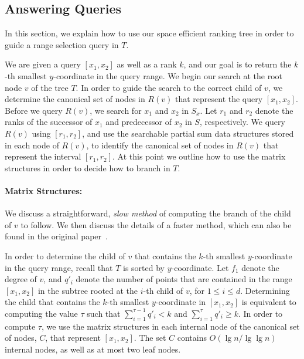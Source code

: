 \documentclass{llncs}
\begin{document}
\subsection{Answering Queries\label{sec:answering}}

In this section, we explain how to use our space efficient ranking
tree in order to guide a range selection query in $T$.

We are given a query $[x_1,x_2]$ as well as a rank $k$, and our goal
is to return the $k$-th smallest $y$-coordinate in the query range.
We begin our search at the root node $v$ of the tree $T$.  In order to
guide the search to the correct child of $v$, we determine the
canonical set of nodes in $R(v)$ that represent the query $[x_1,x_2]$.
Before we query $R(v)$, we search for $x_1$ and $x_2$ in $S_x$.  Let
$r_1$ and $r_2$ denote the ranks of the successor of $x_1$ and
predecessor of $x_2$ in $S$, respectively. We query $R(v)$ using
$[r_1, r_2]$, and use the searchable partial sum data structures
stored in each node of $R(v)$, to identify the canonical set of nodes
in $R(v)$ that represent the interval $[r_1,r_2]$.  At this point we
outline how to use the matrix structures in order to decide how to
branch in $T$.

\paragraph{Matrix Structures:}
We discuss a straightforward, \emph{slow method} of computing the
branch of the child of $v$ to follow.  We then discuss the details of
a faster method, which can also be found in the original
paper~\cite{BGJS10}.

In order to determine the child of $v$ that contains the $k$-th
smallest $y$-coordinate in the query range, recall that $T$ is sorted
by $y$-coordinate.  Let $f_1$ denote the degree of $v$, and $q'_i$
denote the number of points that are contained in the range $[x_1,
  x_2]$ in the subtree rooted at the $i$-th child of $v$, for $1 \le i
\le d$. Determining the child that contains the $k$-th smallest
$y$-coordinate in $[x_1,x_2]$ is equivalent to computing the value
$\tau$ such that $\sum_{i=1}^{\tau-1} q'_i < k$ and $\sum_{i=1}^{\tau}
q'_i \ge k$.  In order to compute $\tau$, we use the matrix structures
in each internal node of the canonical set of nodes, $C$, that
represent $[x_1,x_2]$.  The set $C$ contains $O(\lg n / \lg \lg n)$
internal nodes, as well as at most two leaf nodes.
\end{document}
